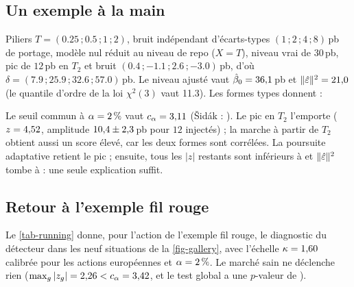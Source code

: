 \subsection{Un exemple à la main}
\begin{example}\label{ex-toy}
Piliers $T=(\num{0.25}\,;\num{0.5}\,;1\,;2)$, bruit indépendant d'écarts-types $(1\,;2\,;4\,;8)$\,pb de portage,
modèle nul réduit au niveau de repo ($X=T$), niveau vrai de $30$\,pb, pic de $12$\,pb en $T_2$ et bruit
$(\num{0.4}\,;\num{-1.1}\,;\num{2.6}\,;\num{-3.0})$\,pb, d'où $\delta=(\num{7.9}\,;\num{25.9}\,;\num{32.6}\,;\num{57.0})$\,pb.
Le niveau ajusté vaut $\hat\beta_0=\num{36.1}$\,pb et $\lVert \hat\varepsilon\rVert^2=\num{21.0}$ (le quantile d'ordre  de la loi
$\chi^2(3)$ vaut \num{11.3}). Les \vToyM{} formes types donnent :
\begin{center}\end{center}
Le seuil commun à $\alpha=\pct{2}$ vaut $c_\alpha=\num{3.11}$ (Šidák : \vToyCsidak). Le pic en $T_2$ l'emporte
($z=\num{4.52}$, amplitude $\num{10.4}\pm\num{2.3}$\,pb pour $12$ injectés) ; la marche à partir de $T_2$ obtient
aussi un score élevé, car les deux formes sont corrélées. La poursuite adaptative retient le pic ; ensuite, tous les
$|z|$ restants sont inférieurs à \vToyZafter{} et $\lVert \hat\varepsilon\rVert^2$ tombe à \vToyQafter{} : une seule explication suffit.
\end{example}

\subsection{Retour à l'exemple fil rouge}\label{sec-retour}
\begin{filrouge}
Le \cref{tab-running} donne, pour l'action de l'exemple fil rouge, le diagnostic du détecteur dans les neuf
situations de la \cref{fig-gallery}, avec l'échelle $\kappa=\num{1.60}$ calibrée pour les actions européennes et
$\alpha=\pct{2}$. Le marché sain ne déclenche rien ($\max_g|z_g|=\num{2.26}<c_\alpha=\num{3.42}$, et le test global a une
$p$-valeur de \vRunChiP).
\end{filrouge}

\begin{table}[ht]
\centering
\caption{Exemple fil rouge : ce qui est injecté et ce qu'en dit le détecteur. $z$ est la statistique \eqref{eq-z} de
la première forme retenue ; les amplitudes sont traduites en unités naturelles (\cref{tab-templates}).}
\label{tab-running}

\end{table}


